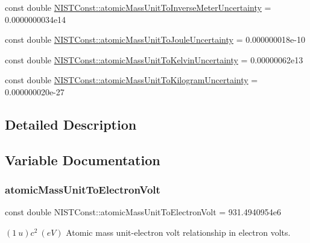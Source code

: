 \begin{DoxyCompactItemize}
\item 
const double \hyperlink{group___atomic_mass_unit_gae2ac6f33619c73c37ef774ca7088844a}{N\+I\+S\+T\+Const\+::atomic\+Mass\+Unit\+To\+Inverse\+Meter\+Uncertainty} = 0.\+0000000034e14
\item 
const double \hyperlink{group___atomic_mass_unit_ga0d86dc8fac39e6589510009376d261d6}{N\+I\+S\+T\+Const\+::atomic\+Mass\+Unit\+To\+Joule\+Uncertainty} = 0.\+000000018e-\/10
\item 
const double \hyperlink{group___atomic_mass_unit_ga124459785d7b4bcbc5a97ed591d859ae}{N\+I\+S\+T\+Const\+::atomic\+Mass\+Unit\+To\+Kelvin\+Uncertainty} = 0.\+00000062e13
\item 
const double \hyperlink{group___atomic_mass_unit_ga8726643b734abfa2cc6c41b98f59f8c2}{N\+I\+S\+T\+Const\+::atomic\+Mass\+Unit\+To\+Kilogram\+Uncertainty} = 0.\+000000020e-\/27
\end{DoxyCompactItemize}


\subsection{Detailed Description}


\subsection{Variable Documentation}
\mbox{\label{group___atomic_mass_unit_ga4a5d912289e6a828a25e9e7ae3385b0d}} 
\subsubsection{\texorpdfstring{atomic\+Mass\+Unit\+To\+Electron\+Volt}{atomicMassUnitToElectronVolt}}
{\footnotesize\ttfamily const double N\+I\+S\+T\+Const\+::atomic\+Mass\+Unit\+To\+Electron\+Volt = 931.\+4940954e6}

$(1\ u)c^2 \ (eV)$ Atomic mass unit-\/electron volt relationship in electron volts. \mbox{\label{group___atomic_mass_unit_ga5b9ec7f36c14dabc54a16d1e076bee14}} 
